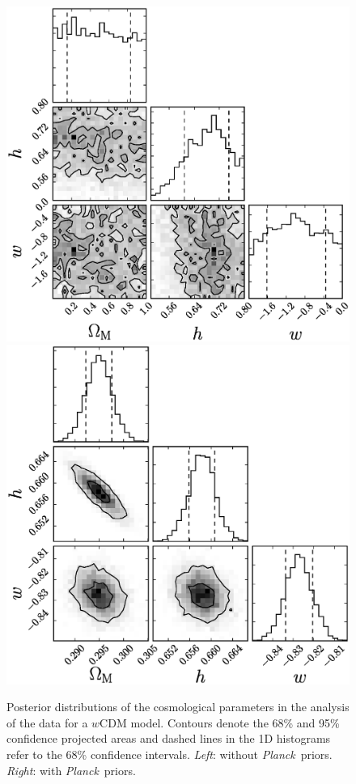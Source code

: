 \documentclass[12pt,a4paper]{article}
\newcommand\Planck{{\it Planck}\ }
\begin{document}
\begin{figure}
  \includegraphics[width=0.5\linewidth]{figures/rest_wcdm_noprior_corner.eps}
  \includegraphics[width=0.5\linewidth]{figures/rest_wcdm_withprior_corner.eps}
  \caption{Posterior distributions of the cosmological parameters in the
    analysis of the \citet{rest2014} data for a $w$CDM model. Contours denote the
    68\% and 95\% confidence projected areas and dashed lines in
    the 1D histograms refer to the 68\% confidence intervals. {\it Left}: without 
    \Planck priors. {\it Right}: with \Planck priors.}
  \label{fig:rest_wcdm_corner}
\end{figure}
%
\end{document}
